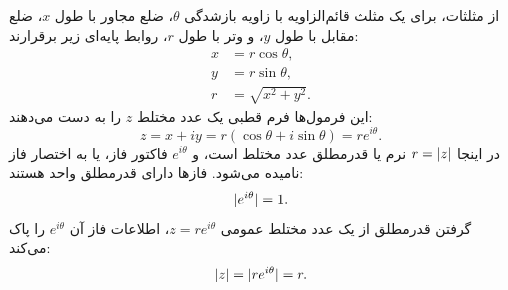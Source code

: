 \documentclass{article}
\begin{document}
از مثلثات، برای یک مثلث قائم‌الزاویه با زاویه بازشدگی $\theta$، ضلع مجاور با طول $x$، ضلع مقابل با طول $y$، و وتر با طول $r$، روابط پایه‌ای زیر برقرارند:
\begin{equation}
\begin{aligned}x & =r\cos\theta,\\
y & =r\sin\theta,\\
r & =\sqrt{x^{2}+y^{2}}.
\end{aligned}
\label{eq:TrigRelationshipsForComplexNumber}
\end{equation}
 این فرمول‌ها فرم قطبی یک عدد مختلط $z$ را به دست می‌دهند:
\begin{equation}
z=x+iy=r\left(\cos\theta+i\sin\theta\right)=re^{i\theta}.\label{eq:PolarFormComplexNumber}
\end{equation}
 در اینجا $r=\vert z\vert$ نرم یا قدرمطلق عدد مختلط است، و $e^{i\theta}$ فاکتور فاز، یا به اختصار فاز نامیده می‌شود.
فازها دارای قدرمطلق واحد هستند:
\begin{equation}
\vert e^{i\theta}\vert=1.\label{eq:PhaseUnitMod}
\end{equation}
 گرفتن قدرمطلق از یک عدد مختلط عمومی $z=re^{i\theta}$، اطلاعات فاز آن $e^{i\theta}$ را پاک می‌کند:
\begin{equation}
\vert z\vert=\vert re^{i\theta}\vert=r.\label{eq:ModGeneralComplexNumberPolar}
\end{equation}
\end{document}
